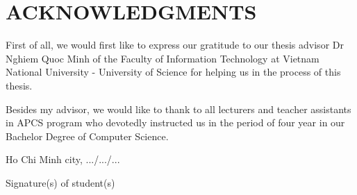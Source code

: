 \chapter*{ACKNOWLEDGMENTS}
\label{thanks}

First of all, we would first like to express our gratitude to our thesis advisor Dr Nghiem Quoc Minh of the Faculty of Information Technology at Vietnam National University - University of Science for helping us in the process of this thesis.

Besides my advisor, we would like to thank to all lecturers and teacher assistants in APCS program who devotedly instructed us in the period of four year in our Bachelor Degree of Computer Science. 




\vspace{3cm}
\hspace{7cm}
\begin{minipage}[ht]{0.48\textwidth}
\begin{center}
Ho Chi Minh city, .../.../...

Signature(s) of student(s) 
\\
\vspace{3cm}
\tenSV  ~~~~~~~   \tenSVt 
\end{center}
\end{minipage}
